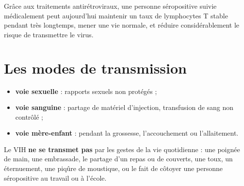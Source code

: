 \begin{illus}
\end{illus}

\begin{remarque}
Grâce aux traitements antirétroviraux, une personne séropositive suivie médicalement
peut aujourd'hui maintenir un taux de lymphocytes T stable pendant très longtemps, mener
une vie normale, et réduire considérablement le risque de transmettre le virus.
\end{remarque}

\section{Les modes de transmission}

\begin{propriete}
\begin{itemize}
\item \textbf{voie sexuelle} : rapports sexuels non protégés ;
\item \textbf{voie sanguine} : partage de matériel d'injection, transfusion de sang non
contrôlé ;
\item \textbf{voie mère-enfant} : pendant la grossesse, l'accouchement ou
l'allaitement.
\end{itemize}
\end{propriete}

\begin{propriete}
Le VIH \textbf{ne se transmet pas} par les gestes de la vie quotidienne : une poignée de
main, une embrassade, le partage d'un repas ou de couverts, une toux, un éternuement, une
piqûre de moustique, ou le fait de côtoyer une personne séropositive au travail ou à
l'école.
\end{propriete}

